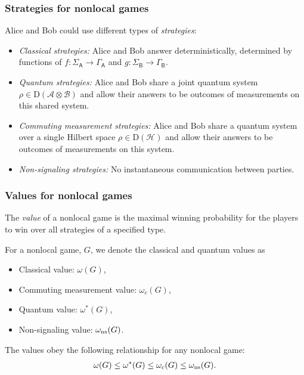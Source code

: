 \documentclass{beamer}
\def\A{\mathcal{A}}
\def\B{\mathcal{B}}
\def\H{\mathcal{H}}
\def \GammaA{\Gamma_{\reg{A}}}
\def \GammaB{\Gamma_{\reg{B}}}
\def \SigmaA{\Sigma_{\reg{A}}}
\def \SigmaB{\Sigma_{\reg{B}}}
\def\ns{\textnormal{ns}}
\newcommand{\setft}[1]{\mathrm{#1}}
\newcommand{\Density}{\setft{D}}
\newcommand{\reg}[1]{\mathsf{#1}}
\begin{document}
\begin{frame}
	\frametitle{Strategies for nonlocal games}
	Alice and Bob could use different types of \emph{strategies}:
	\vspace{2mm}
	\begin{itemize}
		\item \emph{Classical strategies:} Alice and Bob answer deterministically, determined by functions of $f : \SigmaA \rightarrow \GammaA$ and $g : \SigmaB \rightarrow \GammaB$.
		\vspace{5mm}
		\item \emph{Quantum strategies:} Alice and Bob share a joint quantum system $\rho \in \Density(\A \otimes \B)$ and allow their answers to be outcomes of measurements on this shared system.		
		\vspace{5mm}
		\item \emph{Commuting measurement strategies:} Alice and Bob share a quantum system over a single Hilbert space $\rho \in \Density(\H)$ and allow their answers to be outcomes of measurements on this system. 
		\vspace{5mm}
		\item \emph{Non-signaling strategies:} No instantaneous communication between parties.  
	\end{itemize}
\end{frame}

\begin{frame}
	\frametitle{Values for nonlocal games}
	The \emph{value} of a nonlocal game is the maximal winning probability for the players to win over all strategies of a specified type. 
	\vspace{2mm}
	
For a nonlocal game, $G$, we denote the classical and quantum values as 
	\begin{itemize}
		\item Classical value: $\omega(G)$,
		\item Commuting measurement value: $\omega_c(G)$,
		\item Quantum value: $\omega^*(G)$,
		\item Non-signaling value: $\omega_{\ns}(G)$.
	\end{itemize}	
	\vspace{2mm}
	
	The values obey the following relationship for any nonlocal game:
	\begin{align*}
		\omega(G) \leq \omega^*(G) \leq \omega_c(G) \leq \omega_{\ns}(G).
	\end{align*}
\end{frame}
\end{document}
